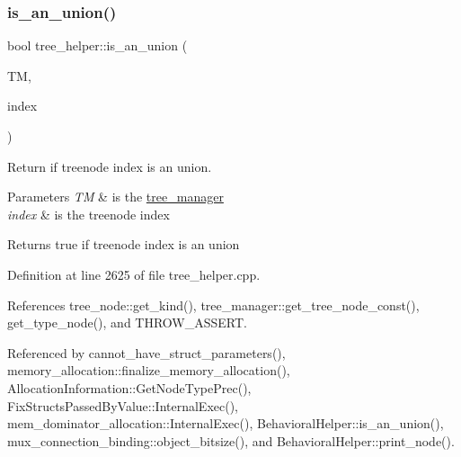 \subsubsection{\texorpdfstring{is\+\_\+an\+\_\+union()}{is\_an\_union()}}
{\footnotesize\ttfamily bool tree\+\_\+helper\+::is\+\_\+an\+\_\+union (\begin{DoxyParamCaption}\item[{const \hyperlink{tree__manager_8hpp_a792e3f1f892d7d997a8d8a4a12e39346}{tree\+\_\+manager\+Const\+Ref} \&}]{TM,  }\item[{const unsigned int}]{index }\end{DoxyParamCaption})\hspace{0.3cm}{\ttfamily [static]}}



Return if treenode index is an union. 


\begin{DoxyParams}{Parameters}
{\em TM} & is the \hyperlink{classtree__manager}{tree\+\_\+manager} \\
\hline
{\em index} & is the treenode index \\
\hline
\end{DoxyParams}
\begin{DoxyReturn}{Returns}
true if treenode index is an union 
\end{DoxyReturn}


Definition at line 2625 of file tree\+\_\+helper.\+cpp.



References tree\+\_\+node\+::get\+\_\+kind(), tree\+\_\+manager\+::get\+\_\+tree\+\_\+node\+\_\+const(), get\+\_\+type\+\_\+node(), and T\+H\+R\+O\+W\+\_\+\+A\+S\+S\+E\+RT.



Referenced by cannot\+\_\+have\+\_\+struct\+\_\+parameters(), memory\+\_\+allocation\+::finalize\+\_\+memory\+\_\+allocation(), Allocation\+Information\+::\+Get\+Node\+Type\+Prec(), Fix\+Structs\+Passed\+By\+Value\+::\+Internal\+Exec(), mem\+\_\+dominator\+\_\+allocation\+::\+Internal\+Exec(), Behavioral\+Helper\+::is\+\_\+an\+\_\+union(), mux\+\_\+connection\+\_\+binding\+::object\+\_\+bitsize(), and Behavioral\+Helper\+::print\+\_\+node().

